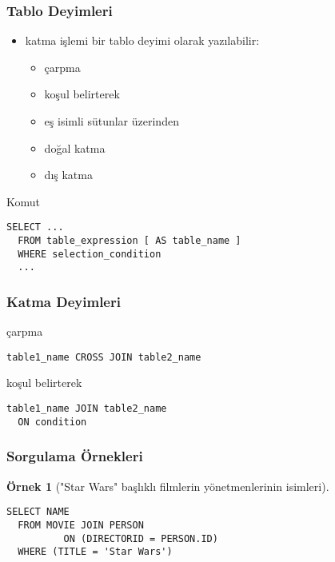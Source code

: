 \documentclass[dvipsnames]{beamer}
\theoremstyle{definition}
\theoremstyle{example}
\newtheorem{ornek}[theorem]{Örnek}
\theoremstyle{plain}
\begin{document}
\begin{frame}[fragile]
  \frametitle{Tablo Deyimleri}

  \begin{itemize}
    \item katma işlemi bir tablo deyimi olarak yazılabilir:
    \begin{itemize}
      \item çarpma
      \item koşul belirterek
      \item eş isimli sütunlar üzerinden
      \item doğal katma
      \item dış katma
    \end{itemize}
  \end{itemize}

  \begin{block}{Komut}
    \begin{lstlisting}
SELECT ...
  FROM table_expression [ AS table_name ]
  WHERE selection_condition
  ...
    \end{lstlisting}
  \end{block}
\end{frame}

\begin{frame}[fragile]
  \frametitle{Katma Deyimleri}

  \begin{block}{çarpma}
    \begin{lstlisting}
table1_name CROSS JOIN table2_name
    \end{lstlisting}
  \end{block}

  \pause
  \begin{block}{koşul belirterek}
    \begin{lstlisting}
table1_name JOIN table2_name
  ON condition
    \end{lstlisting}
  \end{block}
\end{frame}

\begin{frame}[fragile]
  \frametitle{Sorgulama Örnekleri}

  \begin{ornek}["Star Wars" başlıklı filmlerin yönetmenlerinin isimleri]
    \begin{lstlisting}
SELECT NAME
  FROM MOVIE JOIN PERSON
          ON (DIRECTORID = PERSON.ID)
  WHERE (TITLE = 'Star Wars')
    \end{lstlisting}
  \end{ornek}
\end{frame}
\end{document}
